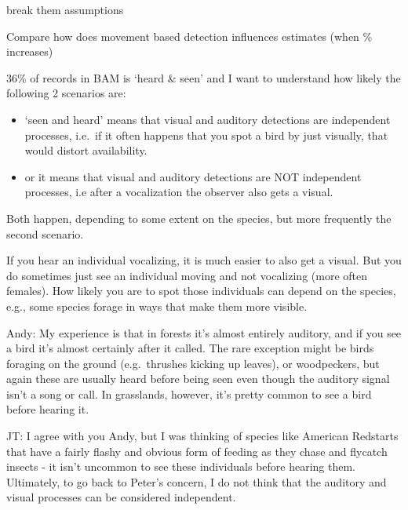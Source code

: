 \documentclass[12pt,]{book}
\newenvironment{Shaded}{\begin{snugshade}}{\end{snugshade}}
\newcommand{\CommentTok}[1]{\textcolor[rgb]{0.56,0.35,0.01}{\textit{#1}}}
\newcommand{\DecValTok}[1]{\textcolor[rgb]{0.00,0.00,0.81}{#1}}
\newcommand{\KeywordTok}[1]{\textcolor[rgb]{0.13,0.29,0.53}{\textbf{#1}}}
\newcommand{\NormalTok}[1]{#1}
\newcommand{\OperatorTok}[1]{\textcolor[rgb]{0.81,0.36,0.00}{\textbf{#1}}}
\newcommand{\StringTok}[1]{\textcolor[rgb]{0.31,0.60,0.02}{#1}}
\providecommand{\tightlist}{%
  \setlength{\itemsep}{0pt}\setlength{\parskip}{0pt}}
\begin{document}
break them assumptions

Compare how does movement based detection influences estimates (when \% increases)

36\% of records in BAM is `heard \& seen' and I want to understand how likely the following 2 scenarios are:

\begin{itemize}
\tightlist
\item
  `seen and heard' means that visual and auditory detections are independent processes, i.e.~if it often happens that you spot a bird by just visually, that would distort availability.
\item
  or it means that visual and auditory detections are NOT independent processes, i.e after a vocalization the observer also gets a visual.
\end{itemize}

Both happen, depending to some extent on the species, but more frequently the second scenario.

If you hear an individual vocalizing, it is much easier to also get a visual. But you do sometimes just see an individual moving and not vocalizing (more often females). How likely you are to spot those individuals can depend on the species, e.g., some species forage in ways that make them more visible.

Andy: My experience is that in forests it's almost entirely auditory, and if you see a bird it's almost certainly after it called. The rare exception might be birds foraging on the ground (e.g.~thrushes kicking up leaves), or woodpeckers, but again these are usually heard before being seen even though the auditory signal isn't a song or call. In grasslands, however, it's pretty common to see a bird before hearing it.

JT: I agree with you Andy, but I was thinking of species like American Redstarts that have a fairly flashy and obvious form of feeding as they chase and flycatch insects - it isn't uncommon to see these individuals before hearing them. Ultimately, to go back to Peter's concern, I do not think that the auditory and visual processes can be considered independent.

\begin{Shaded}
\end{Shaded}
\end{document}
